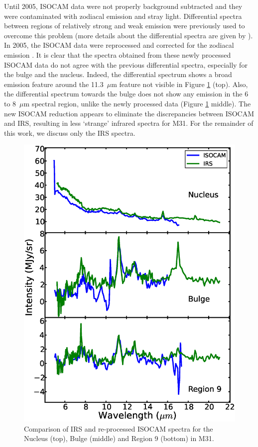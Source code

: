 Until 2005, ISOCAM data were not properly background subtracted and they were contaminated with zodiacal emission and stray light. 
Differential spectra between regions of relatively strong and weak emission were previously used to overcome this problem 
(more details about the differential spectra are given by \citealt{1998Cesarsky}). In 2005, the ISOCAM data were reprocessed 
and corrected for the zodiacal emission \citep{Boulanger_F_2005}. It is clear that the spectra obtained from these newly processed ISOCAM data 
do not agree with the previous differential spectra, especially for the bulge and the nucleus. Indeed, the differential spectrum shows a broad emission feature
around the 11.3~$\mu$m feature not visible in Figure \ref{ISOnIRS} (top). Also, the differential spectrum towards the bulge does not show 
any emission in the 6 to 8~$\mu$m spectral region, unlike the newly processed data (Figure \ref{ISOnIRS} middle).
The new ISOCAM reduction appears to eliminate the discrepancies between ISOCAM and IRS, resulting
in less `strange' infrared spectra for M31. For the remainder of this work, we discuss only the IRS spectra.


\begin{figure}
\centering
\includegraphics[scale=0.35]{./ISOvsIRS.eps}
\caption{ Comparison of  IRS and re-processed ISOCAM spectra for the Nucleus (top), Bulge (middle) and Region 9 (bottom) in M31.}
\label{ISOnIRS}
\end{figure}


